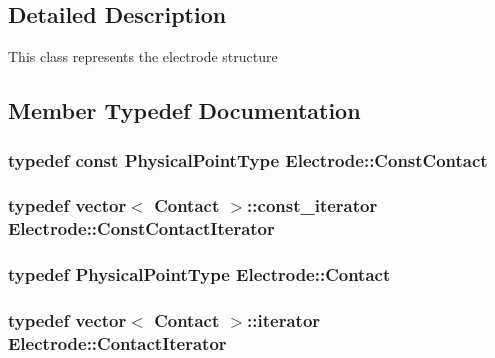 \subsection{Detailed Description}
This class represents the electrode structure 

\subsection{Member Typedef Documentation}
\hypertarget{classElectrode_a6dc621793b4ffa70e6bc3f2627ec8bf6}{
\subsubsection[{Const\-Contact}]{\setlength{\rightskip}{0pt plus 5cm}typedef const {\bf Physical\-Point\-Type} {\bf Electrode\-::\-Const\-Contact}}}\label{classElectrode_a6dc621793b4ffa70e6bc3f2627ec8bf6}
\hypertarget{classElectrode_a8c56b50a83beed1bf104d079083386b5}{
\subsubsection[{Const\-Contact\-Iterator}]{\setlength{\rightskip}{0pt plus 5cm}typedef vector$<$ {\bf Contact} $>$\-::const\-\_\-iterator {\bf Electrode\-::\-Const\-Contact\-Iterator}}}\label{classElectrode_a8c56b50a83beed1bf104d079083386b5}
\hypertarget{classElectrode_ac64c4a90469345a5d3e260da59765a76}{
\subsubsection[{Contact}]{\setlength{\rightskip}{0pt plus 5cm}typedef {\bf Physical\-Point\-Type} {\bf Electrode\-::\-Contact}}}\label{classElectrode_ac64c4a90469345a5d3e260da59765a76}
\hypertarget{classElectrode_a682d94c6e93fc27e2135d3a894fe9722}{
\subsubsection[{Contact\-Iterator}]{\setlength{\rightskip}{0pt plus 5cm}typedef vector$<$ {\bf Contact} $>$\-::iterator {\bf Electrode\-::\-Contact\-Iterator}}}\label{classElectrode_a682d94c6e93fc27e2135d3a894fe9722}



